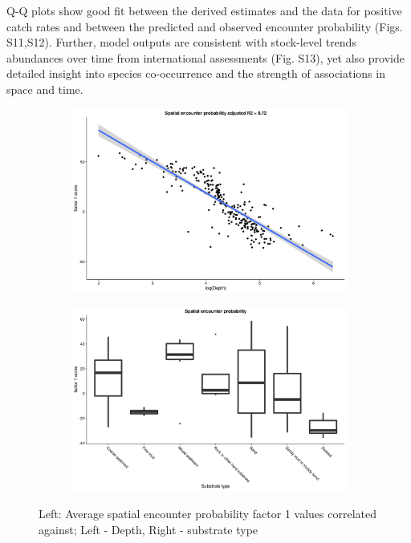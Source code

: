 \documentclass[12pt]{article}
\begin{document}
\begin{linenumbers}
Q-Q plots show good fit between the derived estimates and the data for positive
catch rates and between the predicted and observed encounter probability
(Figs. S11,S12).  Further, model outputs are consistent with
stock-level trends abundances over time from international assessments
(Fig. S13), yet also provide detailed insight into species
co-occurrence and the strength of associations in space and time. 







\begin{figure}[!ht]
	\label{fig:S1}
	\begin{subfigure}{0.5\textwidth}
	\includegraphics[width = \linewidth]{"../figures/Factor1_DepthO1"}
\end{subfigure}
\begin{subfigure}{0.5\textwidth}
	\includegraphics[width = \linewidth]{"../figures/Factor1_HabitatO1"}
\end{subfigure}
\caption{Left: Average spatial encounter probability factor 1 values correlated
	against; Left - Depth, Right - substrate type}


\end{figure}
\end{linenumbers}
\end{document}
